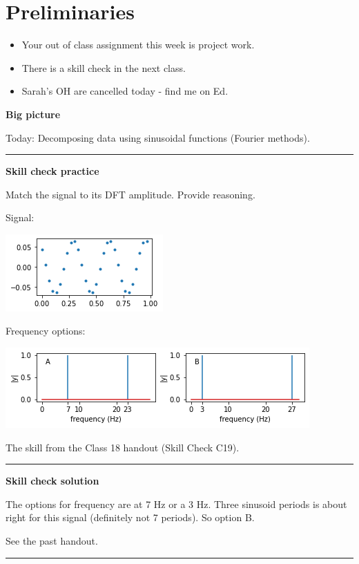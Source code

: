 \documentclass[12pt,letterpaper,noanswers]{exam}
\begin{document}
 \pdfpageheight 11in 
  \pdfpagewidth 8.5in

\noindent 

\section*{Preliminaries}


\begin{itemize}
\itemsep0pt
\item Your out of class assignment this week is project work.
\item There is a skill check in the next class.
\item Sarah's OH are cancelled today - find me on Ed.
\end{itemize}


\noindent\textbf{Big picture}

Today: Decomposing data using sinusoidal functions (Fourier methods).

\vspace{0.2cm}
\hrule
\vspace{0.2cm}

\noindent \textbf{Skill check practice}
\begin{questions}
\item Match the signal to its DFT amplitude.  Provide reasoning.

Signal:

\includegraphics[width=0.3\linewidth]{img/C21skill.png}

Frequency options:

\includegraphics[width=0.7\linewidth]{img/C21skill2.png}


\item The skill from the Class 18 handout (Skill Check C19).
\end{questions}


\vspace{0.2cm}
\hrule
\vspace{0.2cm}

\noindent \textbf{Skill check solution}
\begin{questions}
\item The options for frequency are at 7 Hz or a 3 Hz.  Three sinusoid periods is about right for this signal (definitely not 7 periods).  So option B.
\item See the past handout.
\end{questions}
\vspace{0.2cm}
\hrule
\vspace{0.2cm}
\end{document}
